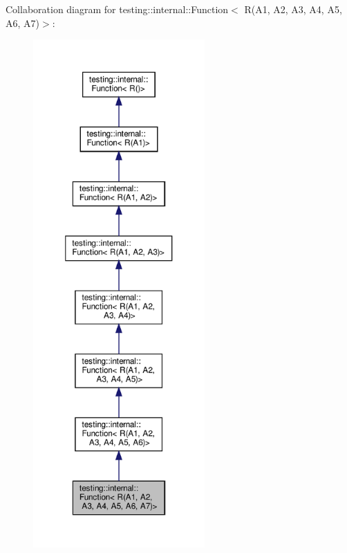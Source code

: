 Collaboration diagram for testing\+:\+:internal\+:\+:Function$<$ R(A1, A2, A3, A4, A5, A6, A7)$>$\+:
\nopagebreak
\begin{figure}[H]
\begin{center}
\leavevmode
\includegraphics[height=550pt]{structtesting_1_1internal_1_1_function_3_01_r_07_a1_00_01_a2_00_01_a3_00_01_a4_00_01_a5_00_01_a6_00_01_a7_08_4__coll__graph}
\end{center}
\end{figure}
